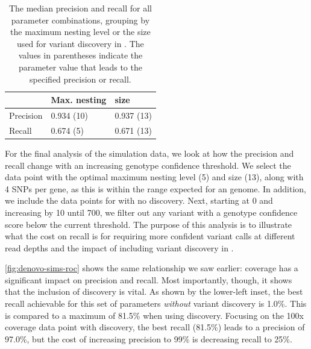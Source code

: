 \begin{table}
\centering
\begin{tabular}{@{}lll@{}}
\toprule
          & Max. nesting & \denovo{} \kmer{} size \\ \midrule
Precision & 0.934 (10)   & 0.937 (13)                                               \\
Recall    & 0.674 (5)    & 0.671 (13)                                               \\ \bottomrule
\end{tabular}
\caption{The median precision and recall for all parameter combinations, grouping by the maximum \prg{} nesting level or the \denovo{} \kmer{} size used for variant discovery in \pandora{}. The values in parentheses indicate the parameter value that leads to the specified precision or recall.}
\label{tab:denovo-summary}
\end{table}

For the final analysis of the simulation data, we look at how the precision and recall change with an increasing genotype confidence threshold. We select the data point with the optimal maximum nesting level (5) and \denovo{} \kmer{} size (13), along with 4 SNPs per gene, as this is within the range expected for an \ecoli{} genome. In addition, we include the data points for \pandora{} with no \denovo{} discovery. Next, starting at 0 and increasing by 10 until 700, we filter out any variant with a genotype confidence score below the current threshold. The purpose of this analysis is to illustrate what the cost on recall is for requiring more confident variant calls at different read depths and the impact of including \denovo{} variant discovery in \pandora{}. 

\autoref{fig:denovo-sims-roc} shows the same relationship we saw earlier: coverage has a significant impact on precision and recall. Most importantly, though, it shows that the inclusion of \denovo{} discovery is vital. As shown by the lower-left inset, the best recall achievable for this set of parameters \emph{without} variant discovery is 1.0\%. This is compared to a maximum of 81.5\% when using \denovo{} discovery. Focusing on the 100x coverage data point with \denovo{} discovery, the best recall (81.5\%) leads to a precision of 97.0\%, but the cost of increasing precision to 99\% is decreasing recall to 25\%. 

